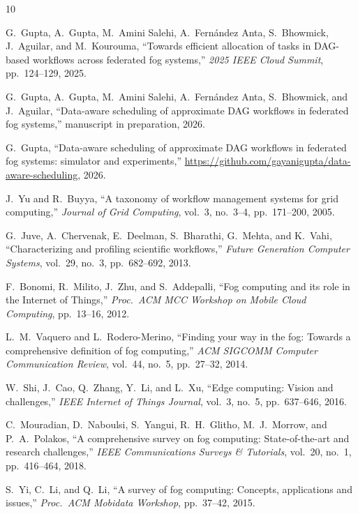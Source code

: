 \documentclass[11pt]{article}
\begin{document}
\begin{thebibliography}{10}\small

G.~Gupta, A.~Gupta, M.~Amini Salehi, A.~Fern\'andez Anta,
S.~Bhowmick, J.~Aguilar, and M.~Kourouma,
``Towards efficient allocation of tasks in DAG-based workflows
across federated fog systems,'' \emph{2025 IEEE Cloud Summit},
pp.~124--129, 2025.

G.~Gupta, A.~Gupta, M.~Amini Salehi, A.~Fern\'andez Anta,
S.~Bhowmick, and J.~Aguilar,
``Data-aware scheduling of approximate DAG workflows in federated
fog systems,'' manuscript in preparation, 2026.

G.~Gupta, ``Data-aware scheduling of approximate DAG workflows in
federated fog systems: simulator and experiments,''
\url{https://github.com/gayanigupta/data-aware-scheduling}, 2026.

J.~Yu and R.~Buyya,
``A taxonomy of workflow management systems for grid
computing,'' \emph{Journal of Grid Computing}, vol.~3, no.~3--4,
pp.~171--200, 2005.

G.~Juve, A.~Chervenak, E.~Deelman, S.~Bharathi, G.~Mehta, and
K.~Vahi,
``Characterizing and profiling scientific workflows,''
\emph{Future Generation Computer Systems}, vol.~29, no.~3,
pp.~682--692, 2013.

F.~Bonomi, R.~Milito, J.~Zhu, and S.~Addepalli,
``Fog computing and its role in the Internet of Things,''
\emph{Proc.\ ACM MCC Workshop on Mobile Cloud Computing},
pp.~13--16, 2012.

L.~M.~Vaquero and L.~Rodero-Merino,
``Finding your way in the fog: Towards a comprehensive
definition of fog computing,'' \emph{ACM SIGCOMM Computer
Communication Review}, vol.~44, no.~5, pp.~27--32, 2014.

W.~Shi, J.~Cao, Q.~Zhang, Y.~Li, and L.~Xu,
``Edge computing: Vision and challenges,'' \emph{IEEE Internet
of Things Journal}, vol.~3, no.~5, pp.~637--646, 2016.

C.~Mouradian, D.~Naboulsi, S.~Yangui, R.~H.~Glitho,
M.~J.~Morrow, and P.~A.~Polakos,
``A comprehensive survey on fog computing: State-of-the-art and
research challenges,'' \emph{IEEE Communications Surveys \&
Tutorials}, vol.~20, no.~1, pp.~416--464, 2018.

S.~Yi, C.~Li, and Q.~Li,
``A survey of fog computing: Concepts, applications and
issues,'' \emph{Proc.\ ACM Mobidata Workshop}, pp.~37--42, 2015.


\end{thebibliography}
\end{document}
